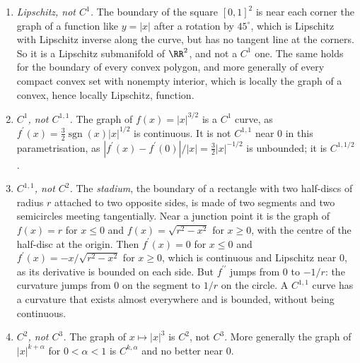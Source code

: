 \begin{example}\label{smooth-manifolds:example-regularity-curves}
\begin{enumerate}
\item \emph{Lipschitz, not $C^1$.} The boundary of the square $[0, 1]^2$ is near each corner the graph of a function like $y = |x|$ after a rotation by $45^\circ$, which is Lipschitz with Lipschitz inverse along the curve,
but has no tangent line at the corners. So it is a Lipschitz submanifold of $\RR^2$, and not a $C^1$ one. The same holds for the boundary of every convex polygon, and more generally of every compact convex set with
nonempty interior, which is locally the graph of a convex, hence locally Lipschitz, function.
\item \emph{$C^1$, not $C^{1,1}$.} The graph of $f(x) = |x|^{3/2}$ is a $C^1$ curve, as $f^{\prime}(x) = \frac32\operatorname{sgn}(x)|x|^{1/2}$ is continuous. It is not $C^{1,1}$ near $0$ in this parametrisation, as
$|f^{\prime}(x) - f^{\prime}(0)|/|x| = \frac32|x|^{-1/2}$ is unbounded; it is $C^{1,1/2}$.
\item \emph{$C^{1,1}$, not $C^2$.} The \emph{stadium}, the boundary of a rectangle with two half-discs of radius $r$ attached to two opposite sides, is made of two segments and two semicircles meeting tangentially. Near
a junction point it is the graph of $f(x) = r$ for $x \leq 0$ and $f(x) = \sqrt{r^2 - x^2}$ for $x \geq 0$, with the centre of the half-disc at the origin. Then $f^{\prime}(x) = 0$ for $x \leq 0$ and
$f^{\prime}(x) = -x/\sqrt{r^2 - x^2}$ for $x \geq 0$, which is continuous and Lipschitz near $0$, as its derivative is bounded on each side. But $f^{\prime\prime}$ jumps from $0$ to $-1/r$: the curvature jumps from
$0$ on the segment to $1/r$ on the circle. A $C^{1,1}$ curve has a curvature that exists almost everywhere and is bounded, without being continuous.
\item \emph{$C^2$, not $C^3$.} The graph of $x \mapsto |x|^3$ is $C^2$, not $C^3$. More generally the graph of $|x|^{k+\alpha}$ for $0 < \alpha < 1$ is $C^{k,\alpha}$ and no better near $0$.
\end{enumerate}
\end{example}


